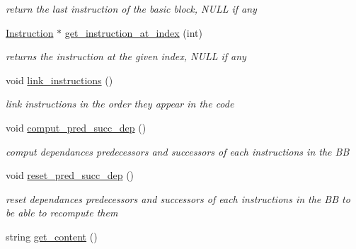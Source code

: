 \begin{DoxyCompactItemize}
\begin{DoxyCompactList}\small\item\em return the last instruction of the basic block, N\+U\+L\+L if any \end{DoxyCompactList}\item 
\hypertarget{class_basic__block_a84aa42e38e2494c2f8ab0a159dba3ca8}{}\hyperlink{class_instruction}{Instruction} $\ast$ \hyperlink{class_basic__block_a84aa42e38e2494c2f8ab0a159dba3ca8}{get\+\_\+instruction\+\_\+at\+\_\+index} (int)\label{class_basic__block_a84aa42e38e2494c2f8ab0a159dba3ca8}

\begin{DoxyCompactList}\small\item\em returns the instruction at the given index, N\+U\+L\+L if any \end{DoxyCompactList}\item 
\hypertarget{class_basic__block_ae53d18eb1436d162ee9ae565c46b35e5}{}void \hyperlink{class_basic__block_ae53d18eb1436d162ee9ae565c46b35e5}{link\+\_\+instructions} ()\label{class_basic__block_ae53d18eb1436d162ee9ae565c46b35e5}

\begin{DoxyCompactList}\small\item\em link instructions in the order they appear in the code \end{DoxyCompactList}\item 
\hypertarget{class_basic__block_a2f2cdedde41f78b7982e6d6d348524c2}{}void \hyperlink{class_basic__block_a2f2cdedde41f78b7982e6d6d348524c2}{comput\+\_\+pred\+\_\+succ\+\_\+dep} ()\label{class_basic__block_a2f2cdedde41f78b7982e6d6d348524c2}

\begin{DoxyCompactList}\small\item\em comput dependances predecessors and successors of each instructions in the B\+B \end{DoxyCompactList}\item 
\hypertarget{class_basic__block_a4ef46cdfb1fa30e3edfc0407b008fa08}{}void \hyperlink{class_basic__block_a4ef46cdfb1fa30e3edfc0407b008fa08}{reset\+\_\+pred\+\_\+succ\+\_\+dep} ()\label{class_basic__block_a4ef46cdfb1fa30e3edfc0407b008fa08}

\begin{DoxyCompactList}\small\item\em reset dependances predecessors and successors of each instructions in the B\+B to be able to recompute them \end{DoxyCompactList}\item 
\hypertarget{class_basic__block_a9c0db81ea09b9aa4e4cdb77cbaf90bdd}{}string \hyperlink{class_basic__block_a9c0db81ea09b9aa4e4cdb77cbaf90bdd}{get\+\_\+content} ()\label{class_basic__block_a9c0db81ea09b9aa4e4cdb77cbaf90bdd}


\end{DoxyCompactItemize}
